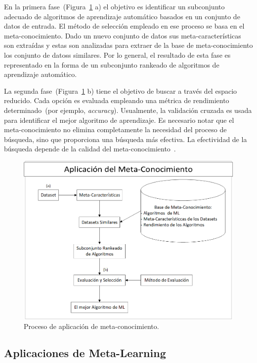 En la primera fase~(Figura~\ref{fig:application} a) el objetivo es identificar
un subconjunto adecuado de algoritmos de aprendizaje automático basados en un
conjunto de datos de entrada. El método de selección empleado en ese proceso se basa en
el meta-conocimiento. Dado un nuevo conjunto de datos sus meta-características son
extraídas y estas son analizadas para extraer de la base de meta-conocimiento
los conjunto de datoss similares. Por lo general, el resultado de esta fase es
representado en la forma de un subconjunto rankeado de algoritmos de
aprendizaje automático.

La segunda fase~(Figura~\ref{fig:application} b) tiene el objetivo de buscar a
través del espacio reducido. Cada opción es evaluada empleando una métrica de
rendimiento determinado~(por ejemplo, \textit{accuracy}). Usualmente, la
validación cruzada es usada para identificar el mejor algoritmo de aprendizaje.
Es necesario notar que el meta-conocimiento no elimina completamente la
necesidad del proceso de búsqueda, sino que proporciona una búsqueda más
efectiva. La efectividad de la búsqueda depende de la calidad del
meta-conocimiento~.


\begin{figure}[H]
	\centering
	\includegraphics[scale=.5]{Figures/application.png}
	\caption{Proceso de aplicación de meta-conocimiento.}
	\label{fig:application}
\end{figure}

\subsection{Aplicaciones de Meta-Learning}\label{subsec:mtl_aplications}

